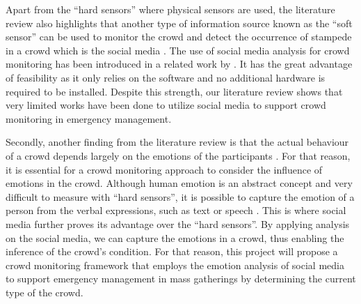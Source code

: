 Apart from the ``hard sensors'' where physical sensors are used, the literature review also highlights that another type of information source known as the ``soft sensor'' can be used to monitor the crowd and detect the occurrence of stampede in a crowd which is the social media \citep{Ramesh2014}. The use of social media analysis for crowd monitoring has been introduced in a related work by \citet{DelirHaghighi2013}. It has the great advantage of feasibility as it only relies on the software and no additional hardware is required to be installed. Despite this strength, our literature review shows that very limited works have been done to utilize social media to support crowd monitoring in emergency management.

Secondly, another finding from the literature review is that the actual behaviour of a crowd depends largely on the emotions of the participants \citep{Kornblum2011, jasper2011emotions}. For that reason, it is essential for a crowd monitoring approach to consider the influence of emotions in the crowd. Although human emotion is an abstract concept and very difficult to measure with ``hard sensors'', it is possible to capture the emotion of a person from the verbal expressions, such as text \citep{alm2005emotions} or speech \citep{sobin1999emotion}. This is where social media further proves its advantage over the ``hard sensors''. By applying analysis on the social media, we can capture the emotions in a crowd, thus enabling the inference of the crowd's condition. For that reason, this project will propose a crowd monitoring framework that employs the emotion analysis of social media to support emergency management in mass gatherings by determining the current type of the crowd. 

